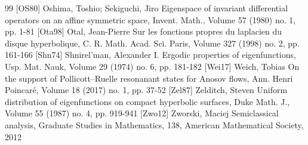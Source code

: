 \documentclass[10pt]{amsart}
\theoremstyle{definition}
\begin{document}
\begin{thebibliography}{99}
 [OS80] Oshima, Toshio; Sekiguchi, Jiro Eigenspace of invariant differential operators on an affine symmetric space, Invent. Math., Volume 57 (1980) no. 1, pp. 1-81
 [Ota98] Otal, Jean-Pierre Sur les fonctions propres du laplacien du disque hyperbolique, C. R. Math. Acad. Sci. Paris, Volume 327 (1998) no. 2, pp. 161-166
 [Shn74] Shnirel’man, Alexander I. Ergodic properties of eigenfunctions, Usp. Mat. Nauk, Volume 29 (1974) no. 6, pp. 181-182
 [Wei17] Weich, Tobias On the support of Pollicott–Ruelle resonanant states for Anosov flows, Ann. Henri Poincaré, Volume 18 (2017) no. 1, pp. 37-52
 [Zel87] Zelditch, Steven Uniform distribution of eigenfunctions on compact hyperbolic surfaces, Duke Math. J., Volume 55 (1987) no. 4, pp. 919-941
 [Zwo12] Zworski, Maciej Semiclassical analysis, Graduate Studies in Mathematics, 138, American Mathematical Society, 2012
\end{thebibliography}
\end{document}
